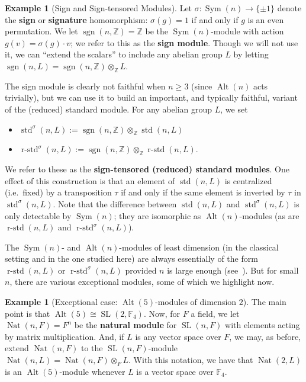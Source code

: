 \documentclass[a4paper, 11pt]{amsart}
\theoremstyle{plain}
\theoremstyle{definition}
\newtheorem{example}[theorem]{Example}
\theoremstyle{remark}
\DeclareMathOperator{\Sym}{Sym}
\DeclareMathOperator{\Alt}{Alt}
\DeclareMathOperator{\std}{std}
\DeclareMathOperator{\sgn}{sgn}
\DeclareMathOperator{\rstd}{r-std}
\DeclareMathOperator{\SL}{SL}
\DeclareMathOperator{\Nat}{Nat}
\newcommand{\bF}{\mathbb{F}}
\newcommand{\bZ}{\mathbb{Z}}
\begin{document}
\begin{example}[Sign and Sign-tensored Modules]
Let $\sigma : \Sym(n) \rightarrow \{\pm 1\}$ denote the \textbf{sign} or \textbf{signature} homomorphism: $\sigma(g) = 1$ if and only if $g$ is an even permutation. We let $\sgn(n,\bZ) = \bZ$ be the $\Sym(n)$-module with action $g(v) = \sigma(g)\cdot v$; we refer to this as the \textbf{sign module}. Though we will not use it, we can ``extend the scalars'' to include any abelian group $L$ by letting $\sgn(n,L) = \sgn(n,\bZ) \otimes_\bZ L$.

The sign module is clearly not faithful when $n\ge 3$ (since $\Alt(n)$ acts trivially), but we can use it to build an important, and typically faithful, variant of the (reduced) standard module. For any abelian group $L$, we set 
\begin{itemize}
\item
$\std^\sigma(n,L) :=  \sgn(n,\bZ) \otimes_\bZ \std(n,L)$
\item
$\rstd^\sigma(n,L) :=  \sgn(n,\bZ) \otimes_\bZ \rstd(n,L)$.
\end{itemize}
We refer to these as the \textbf{sign-tensored (reduced) standard modules}. One effect of this construction is that an element of $\std(n,L)$ is centralized (i.e.~fixed) by a transposition $\tau$ if and only if the same element is inverted by $\tau$ in $\std^\sigma(n,L)$. Note that the difference between $\std(n,L)$ and $\std^\sigma(n,L)$ is only detectable by $\Sym(n)$; they are isomorphic as $\Alt(n)$-modules (as are $\rstd(n,L)$ and $\rstd^\sigma(n,L)$).
\end{example}   

The $\Sym(n)$- and $\Alt(n)$-modules of least dimension (in the classical setting and in the one  studied here) are always essentially of the form $\rstd(n,L)$ or $\rstd^\sigma(n,L)$ provided $n$ is large enough (see~\cite{CDW23}). But for small $n$, there are various exceptional modules, some of which we highlight now. 

\begin{example}[Exceptional case: $\Alt(5)$-modules of dimension $2$]\label{eg.NatSL2}
The main point is that $\Alt(5)\cong\SL(2,\bF_4)$. Now, for $F$ a field, we let $\Nat(n,F) = F^n$ be the \textbf{natural module} for $\SL(n,F)$ with elements acting by matrix multiplication. And, if $L$ is any vector space over $F$, we may, as before, extend $\Nat(n,F)$ to the $\SL(n,F)$-module $\Nat(n,L) =\Nat(n,F)\otimes_{F} L$. With this notation, we have that $\Nat(2,L)$ is an $\Alt(5)$-module whenever $L$ is a vector space over $\bF_4$.
\end{example}
\end{document}
